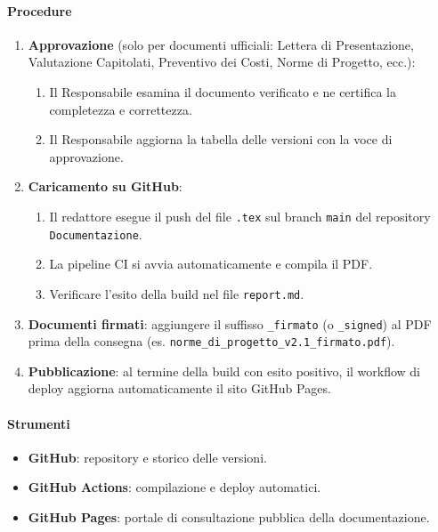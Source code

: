 \documentclass[a4paper, 11pt, oneside]{scrartcl}
\begin{document}
\paragraph{Procedure}
\begin{enumerate}
    \item \textbf{Approvazione} (solo per documenti ufficiali: Lettera di Presentazione, Valutazione Capitolati, Preventivo dei Costi, Norme di Progetto, ecc.):
          \begin{enumerate}[label=\alph*.]
              \item Il Responsabile esamina il documento verificato e ne certifica la completezza e correttezza.
              \item Il Responsabile aggiorna la tabella delle versioni con la voce di approvazione.
          \end{enumerate}
    \item \textbf{Caricamento su GitHub}:
          \begin{enumerate}[label=\alph*.]
              \item Il redattore esegue il push del file \texttt{.tex} sul branch \texttt{main} del repository \texttt{Documentazione}.
              \item La pipeline CI si avvia automaticamente e compila il PDF.
              \item Verificare l'esito della build nel file \texttt{report.md}.
          \end{enumerate}
    \item \textbf{Documenti firmati}: aggiungere il suffisso \texttt{\_firmato} (o \texttt{\_signed}) al PDF prima della consegna (es. \texttt{norme\_di\_progetto\_v2.1\_firmato.pdf}).
    \item \textbf{Pubblicazione}: al termine della build con esito positivo, il workflow di deploy aggiorna automaticamente il sito GitHub Pages.
\end{enumerate}

\paragraph{Strumenti}
\begin{itemize}
    \item \textbf{GitHub}: repository e storico delle versioni.
    \item \textbf{GitHub Actions}: compilazione e deploy automatici.
    \item \textbf{GitHub Pages}: portale di consultazione pubblica della documentazione.
\end{itemize}
\end{document}

